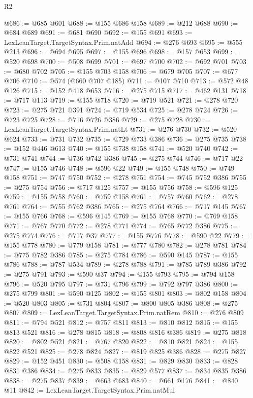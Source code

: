 \begin{lexlean}{R2}
\begin{coremodule}
@686 := @685 @601
@688 := @155 @686 @158
@689 := @212 @688
@690 := @684 @689
@691 := @681 @690
@692 := @155 @691
@693 := LexLeanTarget.TargetSyntax.Prim.natAdd
@694 := @276 @693
@695 := @555 @213
@696 := @694 @695
@697 := @155 @696
@698 := @157 @653
@699 := @520 @698
@700 := @508 @699
@701 := @697 @700
@702 := @692 @701
@703 := @680 @702
@705 := @155 @703 @158
@706 := @679 @705
@707 := @677 @706
@710 := @574 (@660 @707 @185)
@711 := @107 @710
@713 := @572 @48 @126
@715 := @152 @418 @653
@716 := @275 @715
@717 := @462 @131
@718 := @717 @113
@719 := @155 @718
@720 := @719 @521
@721 := @278 @720
@723 := @275 @721 @391
@724 := @719 @534
@725 := @278 @724
@726 := @723 @725
@728 := @716 @726 @386
@729 := @275 @728
@730 := LexLeanTarget.TargetSyntax.Prim.natLt
@731 := @276 @730
@732 := @520 @624
@733 := @731 @732
@735 := @729 @733 @386
@736 := @275 @735
@738 := @152 @446 @613
@740 := @155 @738 @158
@741 := @520 @740
@742 := @731 @741
@744 := @736 @742 @386
@745 := @275 @744
@746 := @717 @22
@747 := @155 @746
@748 := @596 @22
@749 := @155 @748
@750 := @749 @158
@751 := @747 @750
@752 := @278 @751
@754 := @745 @752 @386
@755 := @275 @754
@756 := @717 @125
@757 := @155 @756
@758 := @596 @125
@759 := @155 @758
@760 := @759 @158
@761 := @757 @760
@762 := @278 @761
@764 := @755 @762 @386
@765 := @275 @764
@766 := @717 @145
@767 := @155 @766
@768 := @596 @145
@769 := @155 @768
@770 := @769 @158
@771 := @767 @770
@772 := @278 @771
@774 := @765 @772 @386
@775 := @275 @774
@776 := @717 @37
@777 := @155 @776
@778 := @590 @22
@779 := @155 @778
@780 := @779 @158
@781 := @777 @780
@782 := @278 @781
@784 := @775 @782 @386
@785 := @275 @784
@786 := @590 @145
@787 := @155 @786
@788 := @787 @534
@789 := @278 @788
@791 := @785 @789 @386
@792 := @275 @791
@793 := @590 @37
@794 := @155 @793
@795 := @794 @158
@796 := @520 @795
@797 := @731 @796
@799 := @792 @797 @386
@800 := @275 @799
@801 := @590 @125
@802 := @155 @801
@803 := @802 @158
@804 := @520 @803
@805 := @731 @804
@807 := @800 @805 @386
@808 := @275 @807
@809 := LexLeanTarget.TargetSyntax.Prim.natRem
@810 := @276 @809
@811 := @794 @521
@812 := @757 @811
@813 := @810 @812
@815 := @155 @813 @521
@816 := @278 @815
@818 := @808 @816 @386
@819 := @275 @818
@820 := @802 @521
@821 := @767 @820
@822 := @810 @821
@824 := @155 @822 @521
@825 := @278 @824
@827 := @819 @825 @386
@828 := @275 @827
@829 := @152 @451
@830 := @508 @158
@831 := @829 @830
@833 := @828 @831 @386
@834 := @275 @833
@835 := @829 @577
@837 := @834 @835 @386
@838 := @275 @837
@839 := @663 @683
@840 := @661 @176
@841 := @840 @11
@842 := LexLeanTarget.TargetSyntax.Prim.natMul

\end{coremodule}
\end{lexlean}
